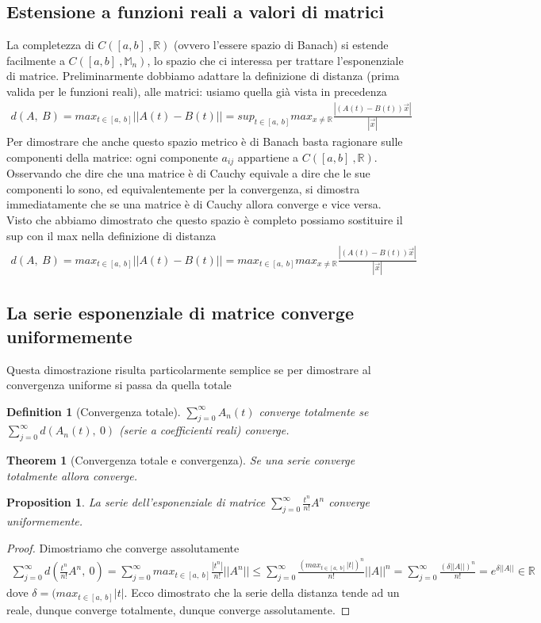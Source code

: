 \documentclass[10pt,a4paper]{article}
\newtheorem{theorem}{Theorem}
\newtheorem{proof}{Proof}
\newtheorem{definition}{Definition}
\newtheorem{prop}{Proposition}
\begin{document}
\subsection{Estensione a funzioni reali a valori di matrici}
La completezza di \(C([a,b]\ , \mathbb{R})\) (ovvero l'essere spazio di Banach) si estende facilmente a \(C([a,b]\ , \mathbb{M}_n)\), lo spazio che ci interessa per trattare l'esponenziale di matrice. Preliminarmente dobbiamo adattare la definizione di distanza (prima valida per le funzioni reali), alle matrici: usiamo quella già vista in precedenza
\begin{align*}
	d(A,\ B) = max_{t\in[a,\ b]}||A(t)-B(t)|| = sup_{t\in[a,\ b]}max_{x\neq \mathbb{R}}\frac{|(A(t)-B(t))\vec{x}|}{|\vec{x}|}
\end{align*}
Per dimostrare che anche questo spazio metrico è di Banach basta ragionare sulle componenti della matrice: ogni componente \(a_{ij}\) appartiene a \(C([a,b]\ , \mathbb{R})\). Osservando che dire che una matrice è di Cauchy equivale a dire che le sue componenti lo sono, ed equivalentemente per la convergenza, si dimostra immediatamente che se una matrice è di Cauchy allora converge e vice versa.  
Visto che abbiamo dimostrato che questo spazio è completo possiamo sostituire il sup con il max nella definizione di distanza
\begin{align*}
d(A,\ B) = max_{t\in[a,\ b]}||A(t)-B(t)|| = max_{t\in[a,\ b]}max_{x\neq \mathbb{R}}\frac{|(A(t)-B(t))\vec{x}|}{|\vec{x}|}
\end{align*}
\subsection{La serie esponenziale di matrice converge uniformemente}
Questa dimostrazione risulta particolarmente semplice se per dimostrare al convergenza uniforme si passa da quella totale
\begin{definition}[Convergenza totale]
	$\sum_{j=0}^{\infty}A_n(t)$ converge totalmente se $\sum_{j=0}^{\infty}d(A_n(t),\ 0)$ (serie a coefficienti reali) converge. 
\end{definition}
\begin{theorem}[Convergenza totale e convergenza]
	Se una serie converge totalmente allora converge. 
\end{theorem}
\begin{prop}
	La serie dell'esponenziale di matrice \(\sum_{j=0}^{\infty}\frac{t^n}{n!}A^n\) converge uniformemente. 
\end{prop}
\begin{proof}
	Dimostriamo che converge assolutamente
	\begin{align*}
		\sum_{j=0}^{\infty}d\left(\frac{t^n}{n!}A^n,\ 0\right) = \sum_{j=0}^{\infty} max_{t\in[a,\ b]}\frac{|t^n|}{n!}||A^n||\leq \sum_{j=0}^{\infty} \frac{(max_{t\in[a,\ b]}|t|)^n}{n!}||A||^n=\sum_{j=0}^{\infty} \frac{(\delta||A||)^n}{n!} = e^{\delta||A||}\in\mathbb{R}
	\end{align*}
dove $\delta = (max_{t\in[a,\ b]}|t|$. Ecco dimostrato che la serie della distanza tende ad un reale, dunque converge totalmente, dunque converge assolutamente.
\end{proof}
\end{document}
